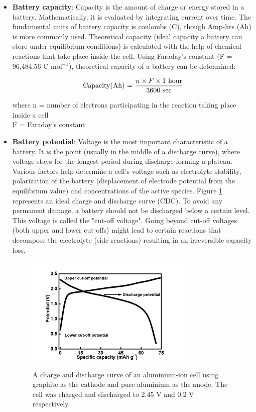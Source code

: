 \begin{itemize}
\item \textbf{Battery capacity}: Capacity is the amount of charge or energy stored in a battery. Mathematically, it is evaluated by integrating current over time. The fundamental units of battery capacity is coulombs (C), though Amp-hrs (Ah) is more commonly used.  Theoretical capacity (ideal capacity a battery can store under equilibrium conditions) is calculated with the help of chemical reactions that take place inside the cell. Using Faraday’s constant (F = 96,484.56 C mol$^{-1}$), theoretical capacity of a battery can be determined:

\begin{equation} \label{eq1}
  \text{Capacity(Ah) = } \frac{n \times F \times 1 \text{ hour}}{3600 \text{ sec}}\\
\end{equation}

where n = number of electrons participating in the reaction taking place inside a cell\\
F = Faraday's constant\\
\item \textbf{Battery potential}: Voltage is the  most important characteristic of a battery. It is the point (usually in the middle of a discharge curve), where voltage stays for the longest period during discharge forming a plateau. Various factors help determine a cell's voltage such as electrolyte stability, polarization of the battery (displacement of electrode potential from the equilibrium value) and concentrations of the active species. Figure \ref{Figures/chap1fig:CDCforcellvoltage} represents an ideal charge and discharge curve (CDC). To avoid any permanent damage, a battery should not be discharged below a certain level. This voltage is called the "cut-off voltage". Going beyond cut-off voltages (both upper and lower cut-offs) might lead to certain reactions that decompose the electrolyte (side reactions) resulting in an irreversible capacity loss. 

\begin{figure}[tbh!]
\centering
\includegraphics[width=0.75\textwidth]{Figures/chap1fig/CDCforcellvoltage}
\caption{A charge and discharge curve of an aluminium-ion cell using graphite as the cathode and pure aluminium as the anode. The cell was charged and discharged to 2.45 V and 0.2 V respectively.}
\label{Figures/chap1fig:CDCforcellvoltage}
\end{figure}


\end{itemize}
